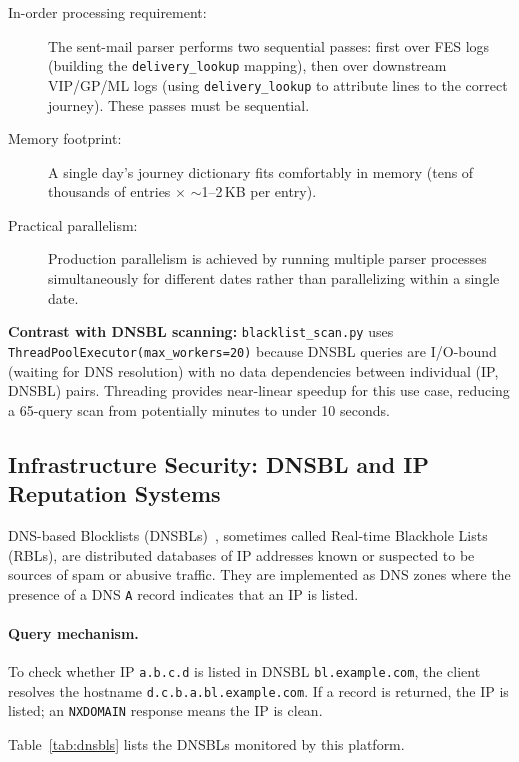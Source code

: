\documentclass[12pt,a4paper,oneside]{report}
\begin{document}
\begin{description}
  \item[In-order processing requirement:] The sent-mail parser performs two sequential passes: first over FES logs (building the \texttt{delivery\_lookup} mapping), then over downstream VIP/GP/ML logs (using \texttt{delivery\_lookup} to attribute lines to the correct journey). These passes must be sequential.
  \item[Memory footprint:] A single day's journey dictionary fits comfortably in memory (tens of thousands of entries $\times$ $\sim$1--2\,KB per entry).
  \item[Practical parallelism:] Production parallelism is achieved by running multiple parser processes simultaneously for different dates rather than parallelizing within a single date.
\end{description}

\textbf{Contrast with DNSBL scanning:} \texttt{blacklist\_scan.py} uses \texttt{ThreadPoolExecutor(max\_workers=20)} because DNSBL queries are I/O-bound (waiting for DNS resolution) with no data dependencies between individual (IP, DNSBL) pairs.
Threading provides near-linear speedup for this use case, reducing a 65-query scan from potentially minutes to under 10 seconds.

\subsection{Infrastructure Security: DNSBL and IP Reputation Systems}

DNS-based Blocklists (DNSBLs)~\cite{spamhaus}, sometimes called Real-time Blackhole Lists (RBLs), are distributed databases of IP addresses known or suspected to be sources of spam or abusive traffic.
They are implemented as DNS zones where the presence of a DNS \texttt{A} record indicates that an IP is listed.

\paragraph{Query mechanism.}
To check whether IP \texttt{a.b.c.d} is listed in DNSBL \texttt{bl.example.com}, the client resolves the hostname \texttt{d.c.b.a.bl.example.com}.
If a record is returned, the IP is listed; an \texttt{NXDOMAIN} response means the IP is clean.

Table~\ref{tab:dnsbls} lists the DNSBLs monitored by this platform.
\end{document}
